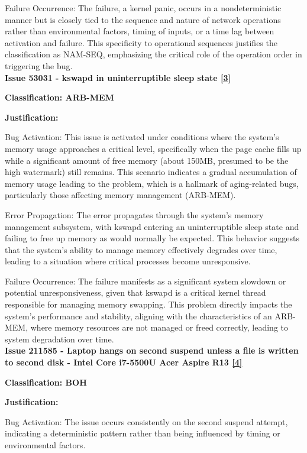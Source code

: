\documentclass[12pt]{article}
\numberwithin{table}{section}
\begin{document}
	Failure Occurrence: The failure, a kernel panic, occurs in a nondeterministic manner but is closely tied to the sequence and nature of network operations rather than environmental factors, timing of inputs, or a time lag between activation and failure. This specificity to operational sequences justifies the classification as NAM-SEQ, emphasizing the critical role of the operation order in triggering the bug.\\
	
	\textbf{Issue 53031 - kswapd in uninterruptible sleep state \href{https://bugzilla.kernel.org/show_bug.cgi?id=53031}{[3]}}
	
	\textbf{Classification: ARB-MEM}
	
	\textbf{Justification:}
	
	Bug Activation: This issue is activated under conditions where the system's memory usage approaches a critical level, specifically when the page cache fills up while a significant amount of free memory (about 150MB, presumed to be the high watermark) still remains. This scenario indicates a gradual accumulation of memory usage leading to the problem, which is a hallmark of aging-related bugs, particularly those affecting memory management (ARB-MEM).
	
	Error Propagation: The error propagates through the system's memory management subsystem, with kswapd entering an uninterruptible sleep state and failing to free up memory as would normally be expected. This behavior suggests that the system's ability to manage memory effectively degrades over time, leading to a situation where critical processes become unresponsive.
	
	Failure Occurrence: The failure manifests as a significant system slowdown or potential unresponsiveness, given that kswapd is a critical kernel thread responsible for managing memory swapping. This problem directly impacts the system's performance and stability, aligning with the characteristics of an ARB-MEM, where memory resources are not managed or freed correctly, leading to system degradation over time.\\
	
	\textbf{Issue 211585 - Laptop hangs on second suspend unless a file is written to second disk - Intel Core i7-5500U Acer Aspire R13 \href{https://bugzilla.kernel.org/show_bug.cgi?id=211585}{[4]}}
	
	\textbf{Classification: BOH}
	
	\textbf{Justification:}
	
	Bug Activation: The issue occurs consistently on the second suspend attempt, indicating a deterministic pattern rather than being influenced by timing or environmental factors.
	
\end{document}
